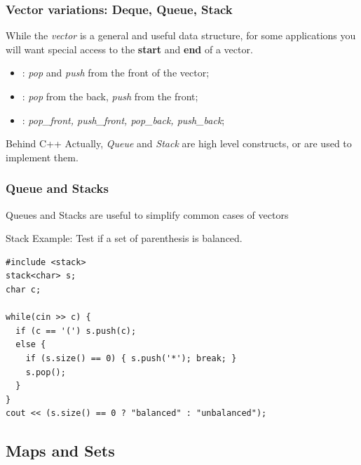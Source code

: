 \begin{frame}
  \frametitle{Vector variations: Deque, Queue, Stack}

  While the \emph{vector} is a general and useful data structure, for some applications you will want special access to the {\bf start} and {\bf end} of a vector. \bigskip

  \begin{itemize}
    \item {}: \emph{pop} and \emph{push} from the front of the vector;
    \bigskip

    \item {}: \emph{pop} from the back, \emph{push} from the front;
    \bigskip

    \item {}: \emph{pop\_front, push\_front, pop\_back, push\_back};
  \end{itemize}
  \bigskip

  \begin{block}{Behind C++}
    Actually, \emph{Queue} and \emph{Stack} are high level constructs,
     or  are used to implement them.
  \end{block}
\end{frame}

\begin{frame}[fragile]
  \frametitle{Queue and Stacks}

  \begin{block}{}
    Queues and Stacks are useful to simplify common cases of vectors
  \end{block}

  Stack Example: Test if a set of parenthesis is balanced.
{\small
\begin{verbatim}
#include <stack>
stack<char> s;
char c;

while(cin >> c) {
  if (c == '(') s.push(c);
  else {
    if (s.size() == 0) { s.push('*'); break; }
    s.pop();
  }
}
cout << (s.size() == 0 ? "balanced" : "unbalanced");
\end{verbatim}}
\end{frame}


\subsection{Maps and Sets}

